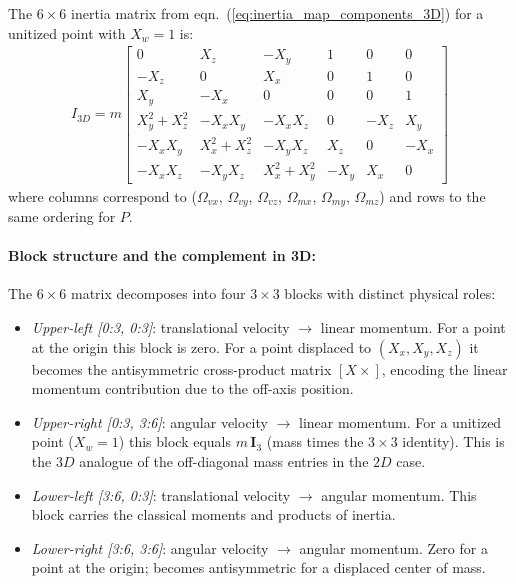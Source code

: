 The $6\times6$ inertia matrix from eqn.~(\ref{eq:inertia_map_components_3D}) for a
unitized point with $X_w = 1$ is:
\begin{align}
    I_{3D} = m
    \begin{bmatrix}
      0              &  X_z           & -X_y           & 1    &  0   &  0   \\
      -X_z           &  0             &  X_x           & 0    &  1   &  0   \\
       X_y           & -X_x           &  0             & 0    &  0   &  1   \\
       X_y^2 + X_z^2 & -X_x X_y       & -X_x X_z       & 0    & -X_z &  X_y \\
      -X_x X_y       &  X_x^2 + X_z^2 & -X_y X_z       & X_z  &  0   & -X_x \\
      -X_x X_z       & -X_y X_z       &  X_x^2 + X_y^2 & -X_y &  X_x &  0
    \end{bmatrix}
    \label{eq:inertia_3D_unitized}
\end{align}
where columns correspond to ($\Omega_{vx}$, $\Omega_{vy}$, $\Omega_{vz}$, $\Omega_{mx}$,
$\Omega_{my}$, $\Omega_{mz}$) and rows to the same ordering for $P$.

\paragraph{Block structure and the complement in 3D:} The $6\times6$ matrix decomposes
into
four $3\times3$ blocks with distinct physical roles:
\begin{itemize}
    \item \emph{Upper-left [0:3, 0:3]}: translational velocity $\to$ linear momentum. For
    a point at the origin this block is zero. For a point displaced to $(X_x, X_y, X_z)$
    it becomes the antisymmetric cross-product matrix $[X\times]$, encoding the linear
    momentum contribution due to the off-axis position.
    \item \emph{Upper-right [0:3, 3:6]}: angular velocity $\to$ linear momentum. For a
    unitized point ($X_w = 1$) this block equals $m\,\mathbf{I}_3$ (mass times the
    $3\times3$ identity). This is the $3D$ analogue of the off-diagonal mass entries in
    the $2D$ case.
    \item \emph{Lower-left [3:6, 0:3]}: translational velocity $\to$ angular momentum.
    This block carries the classical moments and products of inertia.
    \item \emph{Lower-right [3:6, 3:6]}: angular velocity $\to$ angular momentum. Zero for
    a point at the origin; becomes antisymmetric for a displaced center of mass.
\end{itemize}

